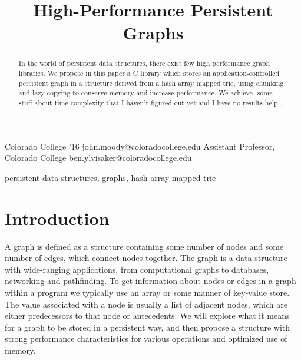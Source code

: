 \documentclass[preprint]{sigplanconf}
\begin{document}
\setlength{\pdfpageheight}{\paperheight}
\setlength{\pdfpagewidth}{\paperwidth}




\title{High-Performance Persistent Graphs}
\subtitle{}

           {Colorado College '16}
           {john.moody@coloradocollege.edu}
           {Assistant Professor, Colorado College}
           {ben.ylvisaker@coloradocollege.edu}

\maketitle


\begin{abstract}
In the world of persistent data structures, there exist few high performance graph libraries.
We propose in this paper a C library which stores an application-controlled persistent graph in a structure derived from a hash array mapped trie, using chunking and lazy copying to conserve memory and increase performance.
We achieve -some stuff about time complexity that I haven't figured out yet and I have no results help-.
\end{abstract}


\keywords
persistent data structures, graphs, hash array mapped trie

\section{Introduction}

A graph is defined as a structure containing some number of nodes and some number of edges, which connect nodes together.
The graph is a data structure with wide-ranging applications, from computational graphs to databases, networking and pathfinding.
To get information about nodes or edges in a graph within a program we typically use an array or some manner of key-value store.
The value associated with a node is usually a list of adjacent nodes, which are either predecessors to that node or antecedents.
We will explore what it means for a graph to be stored in a persistent way, and then propose a structure with strong performance characteristics for various operations and optimized use of memory.
\end{document}
